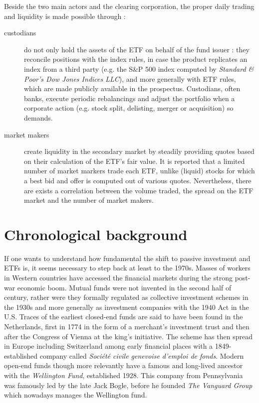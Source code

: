 Beside the two main actors and the clearing corporation, the proper daily trading and liquidity is made possible through :
\begin{description}
\item[custodians] do not only hold the assets of the ETF on behalf of the fund issuer : they reconcile positions with the index rules, in case the product replicates an index from a third party (e.g. the S\&P 500 index computed by \textit{Standard \& Poor's Dow Jones Indices LLC}), and more generally with ETF rules, which are made publicly available in the prospectus. Custodians, often banks, execute periodic rebalancings and adjust the portfolio when a corporate action (e.g. stock split, delisting, merger or acquisition) so demands.
\item[market makers] create liquidity in the secondary market by steadily providing quotes based on their calculation of the ETF's fair value. It is reported that a limited number of market markers trade each ETF, unlike (liquid) stocks for which a best bid and offer is computed out of various quotes. Nevertheless, there are exists a correlation between the volume traded, the spread on the ETF market and the number of market makers. 
\end{description}

\section{Chronological background}
\label{sec:Chronology}
If one wants to understand how fundamental the shift to passive investment and ETFs is, it seems necessary to step back at least to the 1970s. Masses of workers in Western countries have accessed the financial markets during the strong post-war economic boom. Mutual funds were not invented in the second half of  century, rather were they formally regulated as collective investment schemes in the 1930s and more generally as investment companies with the 1940 Act in the U.S. Traces of the earliest closed-end funds are said to have been found in the Netherlands, first in 1774 in the form of a merchant's investment trust and then after the Congress of Vienna at the king's initiative. The scheme has then spread in Europe including Switzerland among early financial places with a 1849-established company called \emph{Société civile genevoise d'emploi de fonds}. Modern open-end funds though more relevantly have a famous and long-lived ancestor with the \emph{Wellington Fund}, established 1928. This company from Pennsylvania was famously led by the late Jack Bogle, before he founded \emph{The Vanguard Group} which nowadays manages the Wellington fund. 

